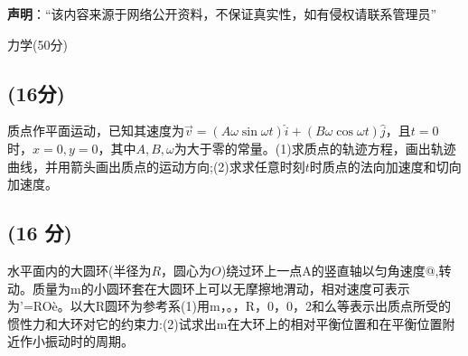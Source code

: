 
\textbf{声明}：“该内容来源于网络公开资料，不保证真实性，如有侵权请联系管理员”

力学(50分)
\subsection{(16分)}
质点作平面运动，已知其速度为$\vec{v} = (A \omega \sin \omega t) \hat{i} + (B \omega \cos \omega t) \hat{j}$，且$t=0$时，$x=0,y=0$，其中$A,B,\omega$为大于零的常量。(1)求质点的轨迹方程，画出轨迹曲线，并用箭头画出质点的运动方向;(2)求求任意时刻$t$时质点的法向加速度和切向
加速度。
\subsection{(16 分)}
水平面内的大圆环(半径为$R$，圆心为$O$)绕过环上一点A的竖直轴以匀角速度@,转动。质量为m的小圆环套在大圆环上可以无摩擦地渭动，相对速度可表示为’=ROè。以大R圆环为参考系(1)用m，。，R，0，0，2和么等表示出质点所受的惯性力和大环对它的约束力:(2)试求出m在大环上的相对平衡位置和在平衡位置附近作小振动时的周期。






